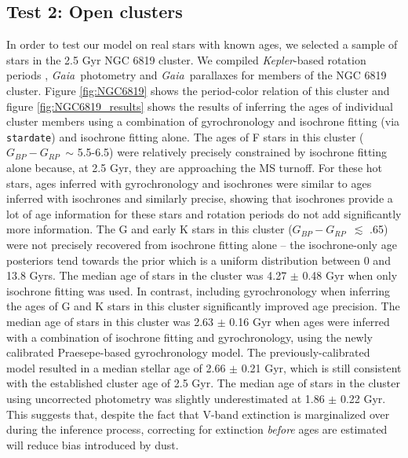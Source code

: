 \documentclass[useAMS, usenatbib, preprint, 12pt]{aastex}
\newcommand{\kepler}{{\it Kepler}}
\newcommand{\Gaia}{{\it Gaia}}
\newcommand{\gaia}{{\it Gaia}}
\newcommand{\sd}{{\tt stardate}}
\newcommand{\gcolor}{$G_{BP} - G_{RP}$}
\begin{document}
\subsection{Test 2: Open clusters}
In order to test our model on real stars with known ages, we selected a sample
of stars in the 2.5 Gyr NGC 6819 cluster.
We compiled \kepler-based rotation periods \citep{meibom2015}, \Gaia\
photometry and \gaia\ parallaxes for members of the NGC 6819 cluster.
Figure \ref{fig:NGC6819} shows the period-color relation of this
cluster and figure \ref{fig:NGC6819_results} shows the results of inferring
the ages of individual cluster members using a combination of gyrochronology
and isochrone fitting (via \sd) and isochrone fitting alone.
The ages of F stars in this cluster (\gcolor\ $\sim$ 5.5-6.5) were relatively
precisely constrained by isochrone fitting alone because, at 2.5 Gyr, they are
approaching the MS turnoff.
For these hot stars, ages inferred with gyrochronology and isochrones were
similar to ages inferred with isochrones and similarly precise, showing that
isochrones provide a lot of age information for these stars and rotation
periods do not add significantly more information.
The G and early K stars in this cluster (\gcolor\ $\lesssim$ .65) were not
precisely recovered from isochrone fitting alone -- the isochrone-only age
posteriors tend towards the prior which is a uniform distribution between 0
and 13.8 Gyrs.
The median age of stars in the cluster was 4.27 $\pm$ 0.48 Gyr when only
isochrone fitting was used.
In contrast, including gyrochronology when inferring the ages of G and K stars
in this cluster significantly improved age precision.
The median age of stars in this cluster was 2.63 $\pm$ 0.16 Gyr when ages were
inferred with a combination of isochrone fitting and gyrochronology, using the
newly calibrated Praesepe-based gyrochronology model.
The previously-calibrated \citet{angus2015} model resulted in a median stellar
age of 2.66 $\pm$ 0.21 Gyr, which is still consistent with the established
cluster age of 2.5 Gyr.
The median age of stars in the cluster using uncorrected photometry was
slightly underestimated at 1.86 $\pm$ 0.22 Gyr.
This suggests that, despite the fact that V-band extinction is marginalized
over during the inference process, correcting for extinction {\it before} ages
are estimated will reduce bias introduced by dust.
\end{document}
